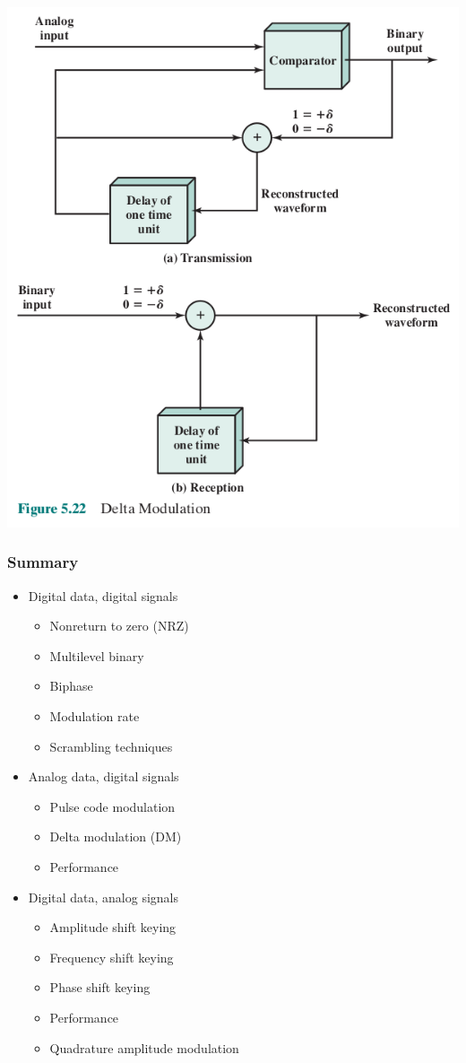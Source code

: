 \documentclass[pdflatex,compress]{beamer}
\begin{document}
\begin{frame}
	\begin{center}
		\includegraphics[width=0.6\linewidth]{img/img28}
	\end{center}
\end{frame}

\begin{frame}
	\frametitle{Summary}
	\begin{multicols}{2}
		\begin{itemize}
			\item Digital data, digital signals
			\begin{itemize}
				\item Nonreturn to zero (NRZ)
				\item Multilevel binary
				\item Biphase
				\item Modulation rate
				\item Scrambling techniques
			\end{itemize}
			\item Analog data, digital signals
			\begin{itemize}
				\item Pulse code modulation
				\item Delta modulation (DM)
				\item Performance
			\end{itemize}
			\columnbreak
			\item Digital data, analog signals
			\begin{itemize}
				\item Amplitude shift keying
				\item Frequency shift keying
				\item Phase shift keying
				\item Performance
				\item Quadrature amplitude modulation
			\end{itemize}
		\vfill\null
		\end{itemize}
	\end{multicols}
\end{frame}
\end{document}
